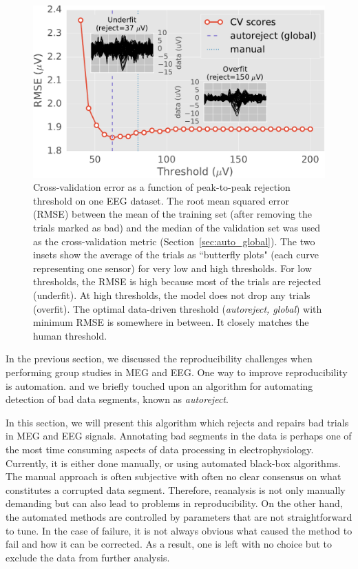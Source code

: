 \begin{figure}[t]
	\centering
	\includegraphics[width=0.8\linewidth]{figures/figure1.pdf}
    \caption[]{Cross-validation error as a function of peak-to-peak rejection threshold on one EEG dataset. The root mean squared error (RMSE) between the mean of the training set (after removing the trials marked as bad) and the median of the validation set was used as the cross-validation metric (Section~\ref{sec:auto_global}). The two insets show the average of the trials as ``butterfly plots" (each curve representing one sensor) for very low and high thresholds. For low thresholds, the RMSE is high because most of the trials are rejected (underfit). At high thresholds, the model does not drop any trials (overfit). The optimal data-driven threshold (\emph{autoreject, global}) with minimum RMSE is somewhere in between. It closely matches the human threshold.}
    \label{fig:sommaire:cross_val}
\end{figure}

In the previous section, we discussed the reproducibility challenges when performing group studies in \ac{MEG} and \ac{EEG}. One way to improve reproducibility is automation. and we briefly touched upon an algorithm for automating detection of bad data segments, known as \emph{autoreject}.

In this section, we will present this algorithm which rejects and repairs bad trials in \ac{MEG} and \ac{EEG} signals. Annotating bad segments in the data is perhaps one of the most time consuming aspects of data processing in electrophysiology. Currently, it is either done manually, or using automated black-box algorithms. The manual approach is often subjective with often no clear consensus on what constitutes a corrupted data segment. Therefore, reanalysis is not only manually demanding but can also lead to problems in reproducibility. On the other hand, the automated methods are controlled by parameters that are not straightforward to tune. In the case of failure, it is not always obvious what caused the method to fail and how it can be corrected. As a result, one is left with no choice but to exclude the data from further analysis.

